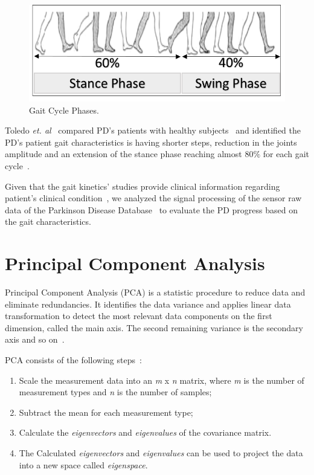 \documentclass[10pt, conference, compsocconf]{IEEEtran}
\begin{document}
\begin{figure}[!ht]
\centering
\includegraphics[width=.49\textwidth]{img/gaitlmm2.png}
\caption{Gait Cycle Phases.}
\label{fig:gaitcycles}
\end{figure}

Toledo \textit{et. al}~\cite{toledo2005} compared PD's patients with healthy subjects~\cite{toledo2005,visionbased2009} and identified the PD's patient gait characteristics is having shorter steps, reduction in the joints amplitude and an extension of the stance phase reaching almost $80\%$ for each gait cycle~\cite{ambulatory2010}.

Given that the gait kinetics' studies provide clinical information regarding patient's clinical condition~\cite{gaitusingsensorsreview2012}, we analyzed the signal processing of the sensor raw data of the Parkinson Disease Database~\cite{physionet} to evaluate the PD progress based on the gait characteristics. 

\section{Principal Component Analysis}\label{sec:pca}

%
%



Principal Component Analysis (PCA) is a statistic procedure to reduce data and eliminate redundancies. It identifies the data variance and applies linear data transformation to detect the most relevant data components on the first dimension, called the main axis.  The second remaining variance is the secondary axis and so on~\cite{pcarotor2014}.

PCA consists of the following steps~\cite{Shlens05atutorial}: 
\begin{enumerate}
 \item Scale the measurement data into an \textit{m} x \textit{n} matrix, where \textit{m} is the number of measurement types and \textit{n} is the number of samples;
 \item Subtract the mean for each measurement type;
 \item Calculate the \textit{eigenvectors} and \textit{eigenvalues} of the covariance matrix.
 \item The Calculated \textit{eigenvectors} and \textit{eigenvalues} can be used to project the data into a new space called \textit{eigenspace}.
\end{enumerate}
\end{document}
